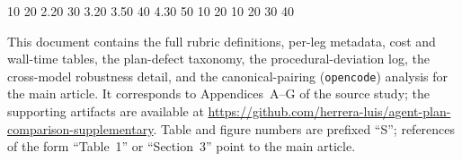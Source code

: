 \documentclass[engproc,supfile,submit,oneauthor]{Definitions/mdpi}
\begin{document}
\maketitle

\renewcommand{\thetable}{S\arabic{table}}
\renewcommand{\thefigure}{S\arabic{figure}}
\setcounter{table}{0}
\setcounter{figure}{0}
\setcounter{section}{0}

\makeatletter
\expandafter\gdef\csname r@sec:intro\endcsname{{1}{0}{}{}{}}
\expandafter\gdef\csname r@sec:method\endcsname{{2}{0}{}{}{}}
\expandafter\gdef\csname r@subsec:rubric\endcsname{{2.2}{0}{}{}{}}
\expandafter\gdef\csname r@sec:results\endcsname{{3}{0}{}{}{}}
\expandafter\gdef\csname r@subsec:defect-convergence\endcsname{{3.2}{0}{}{}{}}
\expandafter\gdef\csname r@subsec:recommendation\endcsname{{3.5}{0}{}{}{}}
\expandafter\gdef\csname r@sec:discussion\endcsname{{4}{0}{}{}{}}
\expandafter\gdef\csname r@sec:threats\endcsname{{4.3}{0}{}{}{}}
\expandafter\gdef\csname r@sec:conclusion\endcsname{{5}{0}{}{}{}}
\expandafter\gdef\csname r@fig:arch\endcsname{{1}{0}{}{}{}}
\expandafter\gdef\csname r@fig:aggregate\endcsname{{2}{0}{}{}{}}
\expandafter\gdef\csname r@tab:aggregate\endcsname{{1}{0}{}{}{}}
\expandafter\gdef\csname r@tab:regex-trap-cross-model\endcsname{{2}{0}{}{}{}}
\expandafter\gdef\csname r@tab:opx-summary\endcsname{{3}{0}{}{}{}}
\expandafter\gdef\csname r@tab:matrix\endcsname{{4}{0}{}{}{}}
\makeatother

\noindent This document contains the full rubric definitions, per-leg
metadata, cost and wall-time tables, the plan-defect taxonomy, the
procedural-deviation log, the cross-model robustness detail, and the
canonical-pairing (\texttt{opencode}) analysis for the main article. It
corresponds to Appendices~A--G of the source study; the supporting
artifacts are available at
\url{https://github.com/herrera-luis/agent-plan-comparison-supplementary}. Table and figure
numbers are prefixed ``S''; references of the form ``Table~1'' or
``Section~3'' point to the main article.












\end{document}
